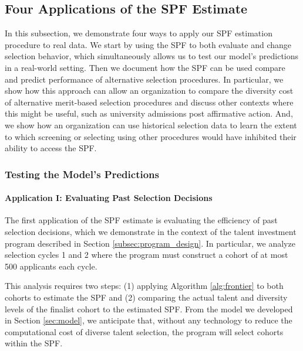 \subsection{Four Applications of the SPF Estimate} \label{subsec:efficiency} 

In this subsection, we demonstrate four ways to apply our SPF estimation procedure to real data. We start by using the SPF to both evaluate and change selection behavior, which simultaneously allows us to test our model's predictions in a real-world setting. Then we document how the SPF can be used compare and predict performance of alternative selection procedures. In particular, we show how this approach can allow an organization to compare the diversity cost of alternative merit-based selection procedures and discuss other contexts where this might be useful, such as university admissions post affirmative action. And, we show how an organization can use historical selection data to learn the extent to which screening or selecting using other procedures would have inhibited their ability to access the SPF. 

\subsubsection{Testing the Model's Predictions}

\paragraph*{Application I: Evaluating Past Selection Decisions}

The first application of the SPF estimate is evaluating the efficiency of past selection decisions, which we demonstrate in the context of the talent investment program described in Section \ref{subsec:program_design}. In particular, we analyze selection cycles 1 and 2 where the program must construct a cohort of at most 500 applicants each cycle. 

This analysis requires two steps: (1) applying Algorithm \ref{alg:frontier} to both cohorts to estimate the SPF and (2) comparing the actual talent and diversity levels of the finalist cohort to the estimated SPF. From the model we developed in Section \ref{sec:model}, we anticipate that, without any technology to reduce the computational cost of diverse talent selection, the program will select cohorts within the SPF.

